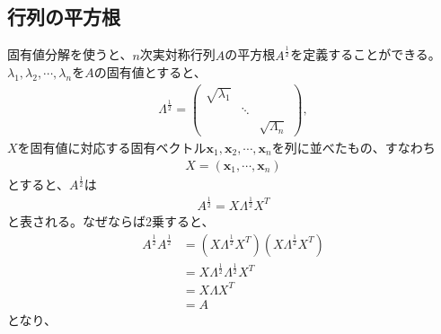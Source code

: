 \subsection{行列の平方根}
固有値分解を使うと、$n$次実対称行列$A$の平方根$\displaystyle{A^{\frac{1}{2}}}$を定義することができる。$\lambda_1, \lambda_2, \cdots, \lambda_n$を$A$の固有値とすると、
\begin{align*}
  \Lambda^{\frac{1}{2}} = \left(
                            \begin{array}{ccc}
                              \sqrt{\lambda_1} &        & \\
                                               & \ddots & \\
                                               &        & \sqrt{\Lambda_n}
                            \end{array}
                          \right),
\end{align*}
$X$を固有値に対応する固有ベクトル$\mathbf{x}_1, \mathbf{x}_2, \cdots, \mathbf{x}_n$を列に並べたもの、すなわち
\begin{align*}
  X = \left(\mathbf{x}_1, \cdots, \mathbf{x}_n\right)
\end{align*}
とすると、$A^\frac{1}{2}$は
\begin{align*}
  A^\frac{1}{2} = X \Lambda^{\frac{1}{2}} X^T
\end{align*}
と表される。なぜならば2乗すると、
\begin{align*}
  A^{\frac{1}{2}} A^{\frac{1}{2}} & = \left(X \Lambda^{\frac{1}{2}} X^T\right) \left(X \Lambda^{\frac{1}{2}} X^T\right) \\
                                  & = X \Lambda^{\frac{1}{2}} \Lambda^{\frac{1}{2}} X^T \\
                                  & = X \Lambda X^T \\
                                  & = A
\end{align*}
となり、
